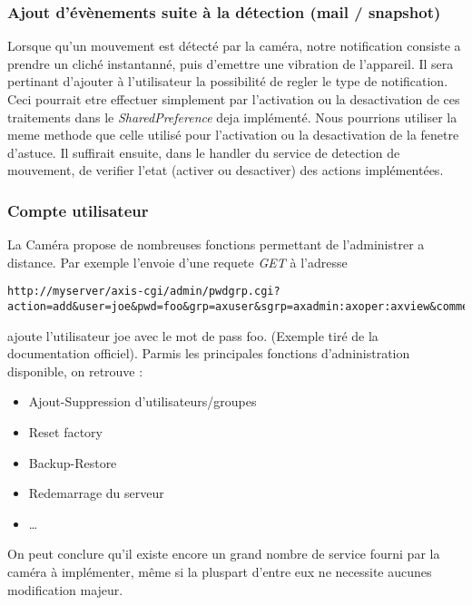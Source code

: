 \subsubsection{Ajout d'évènements suite à la détection (mail / snapshot)}
Lorsque qu'un mouvement est détecté par la caméra, notre notification consiste a
prendre un cliché instantanné, puis d'emettre une vibration de l'appareil. Il
sera pertinant d'ajouter à l'utilisateur la possibilité de regler le type de
notification. Ceci pourrait etre effectuer simplement par l'activation ou la
desactivation de ces traitements dans le \textit{SharedPreference} deja
implémenté. \newline
Nous pourrions utiliser la meme methode que celle utilisé pour l'activation ou
la desactivation de la fenetre d'astuce. Il suffirait ensuite, dans le handler
du service de detection de mouvement, de verifier l'etat (activer ou desactiver)
des actions implémentées.

\subsubsection{Compte utilisateur}
La Caméra propose de nombreuses fonctions permettant de l'administrer a
distance. Par exemple l'envoie d'une requete \textit{GET} à l'adresse 
\begin{lstlisting}
http://myserver/axis-cgi/admin/pwdgrp.cgi?
action=add&user=joe&pwd=foo&grp=axuser&sgrp=axadmin:axoper:axview&comment=Joe
\end{lstlisting}
ajoute l'utilisateur joe avec le mot de pass foo. (Exemple tiré de la
documentation officiel).\newline
Parmis les principales fonctions d'adninistration disponible, on retrouve : 
\begin{itemize}
  \item Ajout-Suppression d'utilisateurs/groupes
  \item Reset factory
  \item Backup-Restore
  \item Redemarrage du serveur
  \item \ldots
\end{itemize}
On peut conclure qu'il existe encore un grand nombre de service fourni par la
caméra à implémenter, même si la pluspart d'entre eux ne necessite aucunes
modification majeur.
